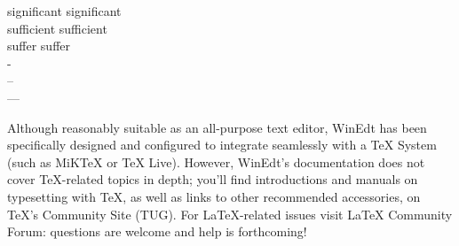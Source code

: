 \documentclass[10pt,a4paper]{article}
\begin{document}
\noindent
{\Huge
significant \hfill signif{}icant \\
sufficient \hfill suf{}f{}icient \\
suffer \hfill suf{}fer\\
-\\
--\\
---\\}

Although reasonably suitable as an all-purpose text editor, WinEdt has been specifically designed and configured to integrate seamlessly with a TeX System (such as MiKTeX or TeX Live). However, WinEdt's documentation does not cover TeX-related topics in depth; you'll find introductions and manuals on typesetting with TeX, as well as links to other recommended accessories, on TeX's Community Site (TUG). For LaTeX-related issues visit LaTeX Community Forum: questions are welcome and help is forthcoming!
\end{document}
